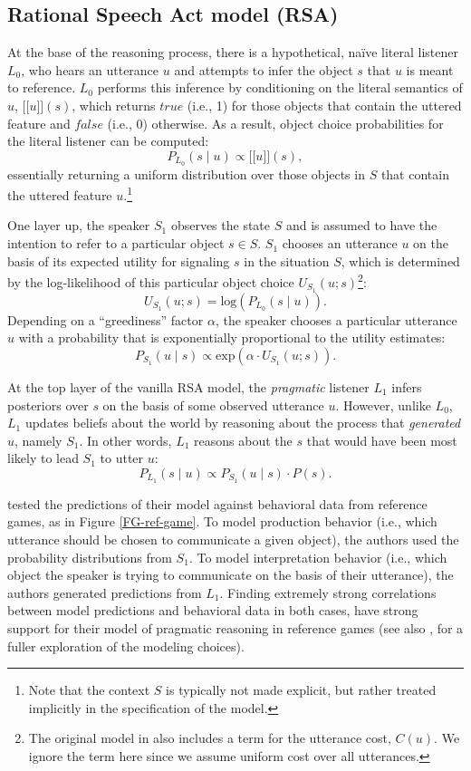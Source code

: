 \documentclass[10pt,a4paper]{article}
\newcommand{\sem}[1]{\mbox{$[\![$#1$]\!]$}}
\begin{document}
\subsection{Rational Speech Act model (RSA)}


At the base of the reasoning process, there is a hypothetical, na\"ive literal listener $L_0$, who hears an utterance $u$ and attempts to infer the object $s$ that $u$ is meant to reference. 
$L_0$ performs this inference by conditioning on the literal semantics of $u$, \sem{$u$}$(s)$, which returns $true$ (i.e., 1) for those objects that contain the uttered feature and $false$ (i.e., 0) otherwise.
As a result, object choice probabilities for the literal listener can be computed:  
$$P_{L_{0}}(s\mid u) \propto \sem{$u$}(s),$$
essentially returning a uniform distribution over those objects in $S$ that contain the uttered feature $u$.\footnote{Note that the context $S$ is typically not made explicit, but rather treated implicitly in the specification of the model.}


One layer up, the speaker $S_1$ observes the state $S$ and is assumed to have the intention to refer to a particular object $s \in S$.
$S_1$ chooses an utterance $u$ on the basis of its expected utility for signaling $s$ in the situation $S$, which is determined by the log-likelihood of this particular object choice $U_{S_1}(u;s)$\footnote{The original model in  also includes a term for the utterance cost, $C(u)$. We ignore the term here since we assume uniform cost over all utterances.}:
$$U_{S_{1}}(u;s) = \textrm{log}(P_{L_{0}}(s \mid u)).$$ 
Depending on a ``greediness'' factor $\alpha$, the speaker chooses a particular utterance $u$ with a probability that is exponentially proportional to the utility estimates: 
$$P_{S_{1}} (u \mid s) \propto   \textrm{exp}(\alpha \cdot U_{S_{1}} (u;s)).$$

At the top layer of the vanilla RSA model, the \emph{pragmatic} listener $L_1$ infers posteriors over $s$ on the basis of some observed utterance $u$.
However, unlike $L_0$, $L_1$ updates beliefs about the world by reasoning about the process that \emph{generated} $u$, namely $S_1$.
In other words, $L_1$ reasons about the $s$ that would have been most likely to lead $S_1$ to utter $u$:
$$P_{L_{1}}(s \mid u) \propto P_{S_{1}}(u \mid s) \cdot P(s).$$

 tested the predictions of their model against behavioral data from reference games, as in Figure \ref{FG-ref-game}.
To model production behavior (i.e., which utterance should be chosen to communicate a given object), the authors used the probability distributions from $S_1$.
To model interpretation behavior (i.e., which object the speaker is trying to communicate on the basis of their utterance), the authors generated predictions from $L_1$.
Finding extremely strong correlations between model predictions and behavioral data in both cases, \citeauthor{frankgoodman2012} have strong support for their model of pragmatic reasoning in reference games (see also , for a fuller exploration of the modeling choices).
\end{document}
